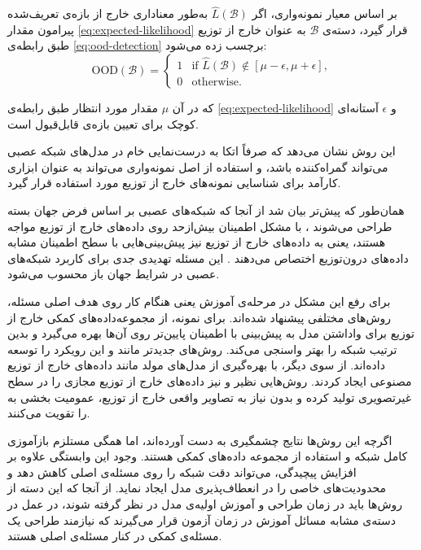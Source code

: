 بر اساس معیار نمونه‌واری، اگر $\hat{L}(\mathcal{B})$ به‌طور معناداری خارج از بازه‌ی تعریف‌شده پیرامون مقدار \eqref{eq:expected-likelihood} قرار گیرد، دسته‌ی $\mathcal{B}$ به عنوان خارج از توزیع طبق رابطه‌ی \ref{eq:ood-detection} برچسب زده می‌شود\cite{typicality}:
\begin{equation}
	\label{eq:ood-detection}
	\text{OOD}(\mathcal{B}) =
	\begin{cases}
		1 & \text{if } \hat{L}(\mathcal{B}) \notin [\mu - \epsilon, \mu + \epsilon], \\
		0 & \text{otherwise}.
	\end{cases}
\end{equation}

که در آن $\mu$ مقدار مورد انتظار طبق رابطه‌ی \ref{eq:expected-likelihood} و $\epsilon$ آستانه‌ای کوچک برای تعیین بازه‌ی قابل‌قبول است. 

این روش نشان می‌دهد که صرفاً اتکا به درست‌نمایی خام در مدل‌های شبکه عصبی می‌تواند گمراه‌کننده باشد، و استفاده از اصل نمونه‌واری می‌تواند به عنوان ابزاری کارآمد برای شناسایی نمونه‌های خارج از توزیع مورد استفاده قرار گیرد.


همان‌طور که پیش‌تر بیان شد از آنجا که شبکه‌های عصبی بر اساس {فرض جهان بسته} طراحی می‌شوند \cite{krizhevsky2017imagenet}، 
با مشکل اطمینان بیش‌ازحد روی داده‌های خارج از توزیع مواجه هستند، 
یعنی به داده‌های خارج از توزیع نیز پیش‌بینی‌هایی با سطح اطمینان مشابه داده‌های درون‌توزیع اختصاص می‌دهند \cite{class-ood2}. 
این مسئله تهدیدی جدی برای کاربرد شبکه‌های عصبی در شرایط {جهان باز} محسوب می‌شود.  

برای رفع این مشکل در مرحله‌ی آموزش یعنی هنگام کار روی هدف اصلی مسئله، روش‌های مختلفی پیشنهاد شده‌اند. 
برای نمونه،  \cite{hendrycks2018deep} 
از مجموعه‌داده‌های کمکی خارج از توزیع برای واداشتن مدل به پیش‌بینی با اطمینان پایین‌تر روی آن‌ها بهره می‌گیرد 
و بدین ترتیب شبکه را بهتر {واسنجی} می‌کند.  
روش‌های جدیدتر مانند \cite{wang2023out} و \cite{zhang2023mixture} این رویکرد را توسعه داده‌اند. 
از سوی دیگر، \cite{tang2023codes} با بهره‌گیری از مدل‌های مولد مانند  داده‌های خارج از توزیع مصنوعی ایجاد کردند.  
روش‌هایی نظیر \cite{du2022vos} و \cite{tao2023npos} نیز داده‌های خارج از توزیع مجازی را در سطح غیرتصویری تولید کرده 
و بدون نیاز به تصاویر واقعی خارج از توزیع، عمومیت ‌بخشی به  را تقویت می‌کنند.  

اگرچه این روش‌ها نتایج چشمگیری به دست آورده‌اند، 
اما همگی مستلزم بازآموزی کامل شبکه و استفاده از مجموعه داده‌های کمکی هستند. 
وجود این وابستگی علاوه بر افزایش پیچیدگی، می‌تواند دقت شبکه را روی مسئله‌ی اصلی کاهش دهد و محدودیت‌های خاصی را در انعطاف‌پذیری مدل ایجاد نماید. 
از آنجا که این دسته از روش‌ها باید در زمان طراحی و آموزش اولیه‌ی مدل در نظر گرفته شوند، 
در عمل در دسته‌ی مشابه مسائل {آموزش در زمان آزمون} \cite{sun2020ttt, gandelsman2022tttmae} قرار می‌گیرند که نیاز‌مند طراحی یک {مسئله‌ی کمکی} در کنار مسئله‌ی اصلی هستند.

